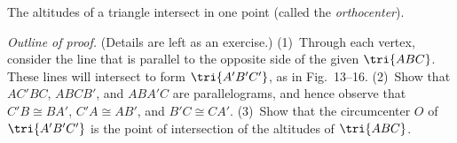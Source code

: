 \documentclass[11pt]{book}
\theoremstyle{bkplain}
\theoremstyle{XIplainnote}
\theoremstyle{bkplain}
\theoremstyle{bkplain}
\begin{document}
\FIGXIIIFIFTEENSIXTEEN

\begin{theorem}
The altitudes of a triangle intersect in one point (called the
\emph{orthocenter}).
\end{theorem}

\noindent\emph{Outline of proof.} (Details are left as an exercise.)
(1)~Through each vertex, consider the line that is parallel to the opposite side
of the given $\tri{ABC}$. These lines will intersect to form $\tri{A'B'C'}$, as
in Fig.~13--16. (2)~Show that $AC'BC$, $ABCB'$, and $ABA'C$ are parallelograms,
and hence observe that $C'B \cong BA'$, $C'A \cong AB'$, and $B'C \cong CA'$.
(3)~Show that the circumcenter $O$ of $\tri{A'B'C'}$ is the point of
intersection of the altitudes of $\tri{ABC}$.

\end{document}
